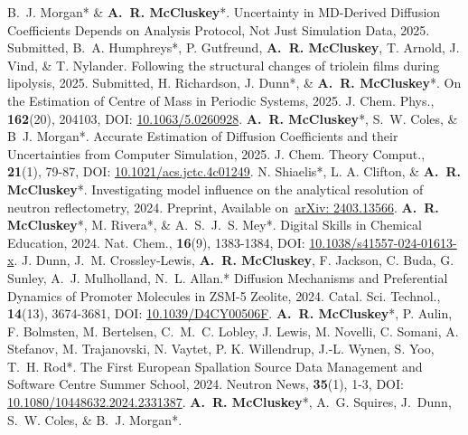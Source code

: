 \begin{benumerate}{25}
   \cvpuby
    {B.~J. Morgan* \& \textbf{A.~R. McCluskey}*.}
    {Uncertainty in MD-Derived Diffusion Coefficients Depends on Analysis Protocol, Not Just Simulation Data,}
    {2025.}
    {Submitted,}
    {}
    {}
   \cvpuby
    {B.~A. Humphreys*, P. Gutfreund, \textbf{A.~R. McCluskey}, T. Arnold, J. Vind, \& T. Nylander.}
    {Following the structural changes of triolein films during lipolysis,}
    {2025.}
    {Submitted,}
    {}
    {}
   \cvpuby
    {H. Richardson, J. Dunn*, \& \textbf{A.~R. McCluskey}*.}
    {On the Estimation of Centre of Mass in Periodic Systems,}
    {2025.}
    {J. Chem. Phys.,}
    {\textbf{162}(20), 204103,}
    {DOI: \href{https://doi.org/10.1063/5.0260928}{10.1063/5.0260928}.}
   \cvpuby
    {\textbf{A.~R. McCluskey}*, S.~W. Coles, \& B~J. Morgan*.}
    {Accurate Estimation of Diffusion Coefficients and their Uncertainties from Computer Simulation,}
    {2025.}
    {J. Chem. Theory Comput.,}
    {\textbf{21}(1), 79-87,}
    {DOI: \href{https://doi.org/10.1021/acs.jctc.4c01249}{10.1021/acs.jctc.4c01249}.}
  \cvpuby
    {N. Shiaelis*, L. A. Clifton, \& \textbf{A.~R. McCluskey}*.}
    {Investigating model influence on the analytical resolution of neutron reflectometry,}
    {2024.}
    {Preprint,}
    {}
    {Available on~\href{https://arxiv.org/abs/2403.13566}{arXiv: 2403.13566}.}
  \cvpuby
    {\textbf{A.~R. McCluskey}*, M. Rivera*, \& A.~S.~J.~S. Mey*.}
    {Digital Skills in Chemical Education,}
    {2024.}
    {Nat. Chem.,}
    {\textbf{16}(9), 1383-1384,}
    {DOI: \href{https://doi.org/10.1038/s41557-024-01613-x}{10.1038/s41557-024-01613-x}.}
  \cvpuby
    {J. Dunn, J.~M. Crossley-Lewis, \textbf{A.~R. McCluskey}, F. Jackson, C. Buda, G. Sunley, A.~J. Mulholland, N.~L. Allan.*}
    {Diffusion Mechanisms and Preferential Dynamics of Promoter Molecules in ZSM-5 Zeolite,}
    {2024.}
    {Catal. Sci. Technol.,}
    {\textbf{14}(13), 3674-3681,}
    {DOI: \href{https://doi.org/10.1039/D4CY00506F}{10.1039/D4CY00506F}.}
  \cvpuby
    {\textbf{A.~R. McCluskey}*, P. Aulin, F. Bolmsten, M. Bertelsen, C.~M.~C. Lobley, J. Lewis, M. Novelli, C. Somani, A. Stefanov, M. Trajanovski, N. Vaytet, P. K. Willendrup, J.-L. Wynen, S. Yoo, T.~H. Rod*.}
    {The First European Spallation Source Data Management and Software Centre Summer School,}
    {2024.}
    {Neutron News,}
    {\textbf{35}(1), 1-3,}
    {DOI: \href{https://doi.org/10.1080/10448632.2024.2331387}{10.1080/10448632.2024.2331387}.}
  \cvpuby
    {\textbf{A.~R. McCluskey}*, A.~G. Squires, J.~Dunn, S.~W. Coles, \& B.~J. Morgan*.}

\end{benumerate}
